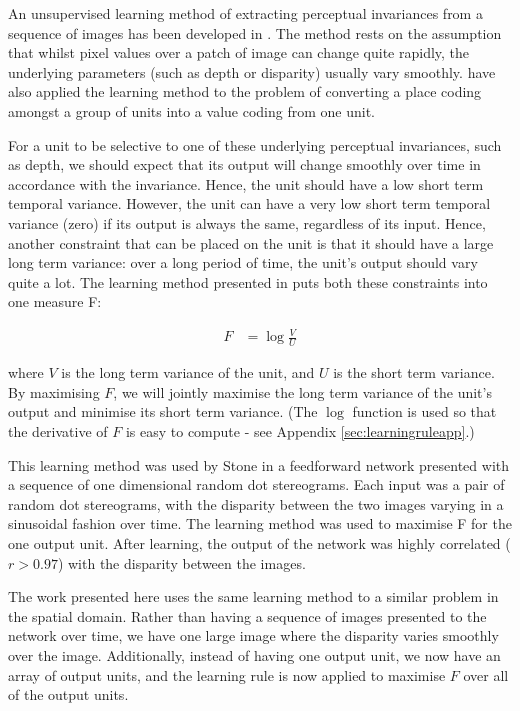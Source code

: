 \documentclass[a4paper]{article}
\begin{document}
An unsupervised learning method of extracting perceptual invariances
from a sequence of images has been developed in \cite{stone95b}.
  The method rests on the assumption that whilst pixel
values over a patch of image can change quite rapidly, the underlying
parameters (such as depth or disparity) usually vary smoothly.
 have also applied the learning method to the problem
of converting a place coding amongst a group of units into a value
coding from one unit.


For a unit to be selective to one of these underlying perceptual
invariances, such as depth, we should expect that its output will
change smoothly over time in accordance with the invariance.  Hence,
the unit should have a low short term temporal variance.  However, the
unit can have a very low short term temporal variance (zero) if its
output is always the same, regardless of its input.  Hence, another
constraint that can be placed on the unit is that it should have a
large long term variance: over a long period of time, the unit's
output should vary quite a lot.  The learning method presented in
\cite{stone95b} puts both these constraints into one measure F:

\begin{align*}
F &= \log \frac{V}{U}
\end{align*}


where $V$ is the long term variance of the unit, and $U$ is the short
term variance.  By maximising $F$, we will jointly maximise the long
term variance of the unit's output and minimise its short term
variance.  (The $\log$ function is used so that the derivative of $F$ is
easy to compute - see Appendix \ref{sec:learningruleapp}.)

This learning method was used by Stone in a feedforward network
presented with a sequence of one dimensional random dot stereograms.
Each input was a pair of random dot stereograms, with the disparity
between the two images varying in a sinusoidal fashion over time.  The
learning method was used to maximise F for the one output unit.  After
learning, the output of the network was highly correlated ($r
> 0.97$) with the disparity between the images.

The work presented here uses the same learning method to a similar
problem in the spatial domain.  Rather than having a sequence of
images presented to the network over time, we have one large image
where the disparity varies smoothly over the image.  Additionally,
instead of having one output unit, we now have an array of output
units, and the learning rule is now applied to maximise $F$ over all of
the output units.
\end{document}
